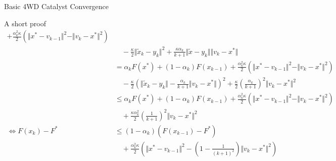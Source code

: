 \documentclass[11pt]{beamer}
\begin{document}
\begin{frame}{Basic 4WD Catalyst Convergence}
\begin{block}{\tiny A short proof}
{{\begin{align*}
                        + \frac{\alpha_k^2\kappa}{2}\left(
                            \Vert x^* - v_{k - 1}\Vert^2 - 
                            \Vert v_k - x^*\Vert^2
                        \right)
                        \\
                        &\quad 
                            - \frac{\kappa}{2}\Vert \tilde x_k - y_k\Vert^2 
                            + \frac{\kappa \alpha_k}{k + 1}\Vert \tilde x - y_k\Vert\Vert v_k - x^*\Vert
                        \\
                        &=
                        \alpha_k F(x^*) + (1 - \alpha_k) F(x_{k - 1}) 
                        + \frac{\alpha_k^2\kappa}{2}\left(
                            \Vert x^* - v_{k - 1}\Vert^2 - 
                            \Vert v_k - x^*\Vert^2
                        \right)
                            \\
                            &\quad 
                            - \frac{\kappa}{2}\left(
                                \Vert \tilde x_k - y_k\Vert
                                - \frac{\alpha_k}{k + 1}\Vert v_k - x^*\Vert
                            \right)^2 
                            + \frac{\kappa}{2}\left(\frac{\alpha_k}{k + 1}\right)^2\Vert v_k - x^*\Vert^2
                        \\ 
                        &\le 
                        \alpha_k F(x^*) + (1 - \alpha_k) F(x_{k - 1}) 
                        + \frac{\alpha_k^2 \kappa}{2}\left(
                            \Vert x^* - v_{k - 1}\Vert^2 - 
                            \Vert v_k - x^*\Vert^2
                        \right)
                            \\
                            &\quad  
                            + \frac{\kappa \alpha_k^2}{2}\left(\frac{1}{k + 1}\right)^2\Vert v_k - x^*\Vert^2
                        \\
                        \iff 
                        F(x_k) - F^*
                        &\le 
                        (1 - \alpha_k)(F(x_{k - 1}) - F^*)
                        \\ &\quad 
                            + 
                            \frac{\alpha_k^2\kappa}{2}
                            \left(
                                \Vert x^* - v_{k - 1}\Vert^2
                                - \left(
                                    1 - \frac{1}{(k + 1)^2}
                                \right)\Vert v_k - x^*\Vert^2
                            \right)
                    \end{align*}
                    }
                }


\end{block}
\end{frame}
\end{document}
